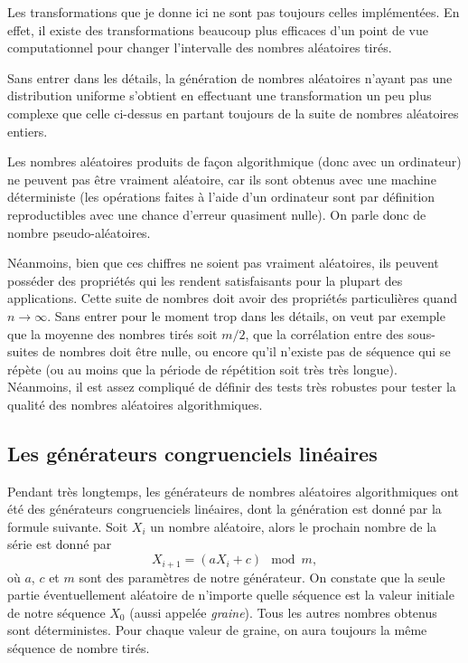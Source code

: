 \documentclass[a4paper,12pt]{book}
\begin{document}
Les transformations que je donne ici ne sont pas toujours celles implémentées. En effet,
il existe des transformations beaucoup plus efficaces d'un point de vue computationnel
pour changer l'intervalle des nombres aléatoires tirés.

Sans entrer dans les détails, la génération de nombres aléatoires n'ayant pas une distribution
uniforme s'obtient en effectuant une transformation un peu plus complexe que celle ci-dessus
en partant toujours de la suite de nombres aléatoires entiers.

Les nombres aléatoires produits de façon algorithmique (donc avec un ordinateur)
ne peuvent pas être vraiment aléatoire, car ils sont obtenus avec une machine 
déterministe (les opérations faites à l'aide d'un ordinateur sont par définition
reproductibles avec une chance d'erreur quasiment nulle). On parle donc de nombre pseudo-aléatoires.

Néanmoins, bien que ces chiffres ne soient pas vraiment aléatoires, ils peuvent 
posséder des propriétés qui les rendent satisfaisants pour la plupart des applications. Cette suite de nombres doit avoir des propriétés particulières quand $n\rightarrow\infty$.
Sans entrer pour le moment trop dans les détails, on veut par exemple que 
la moyenne des nombres tirés soit $m/2$, que la corrélation entre des 
sous-suites de nombres doit être nulle, ou encore qu'il n'existe pas de séquence qui se 
répète (ou au moins que la période de répétition soit très très longue).
Néanmoins, il est assez compliqué de définir des tests
très robustes pour tester la qualité des nombres aléatoires algorithmiques.


\subsection{Les générateurs congruenciels linéaires}\label{sec_congr}

Pendant très longtemps, les générateurs de nombres aléatoires algorithmiques
ont été des générateurs congruenciels linéaires, dont la génération est 
donné par la formule suivante. Soit $X_i$ un nombre aléatoire,
alors le prochain nombre de la série est donné par
\begin{equation}
X_{i+1}=(aX_i+c)\mod m,
\end{equation}
où $a$, $c$ et $m$ sont des paramètres de notre générateur. 
On constate que la seule partie 
éventuellement aléatoire de n'importe quelle séquence est la valeur initiale 
de notre séquence $X_0$ (aussi appelée \textit{graine}). 
Tous les autres nombres obtenus sont déterministes. Pour chaque valeur de graine, 
on aura toujours la même séquence de nombre tirés.
\end{document}
